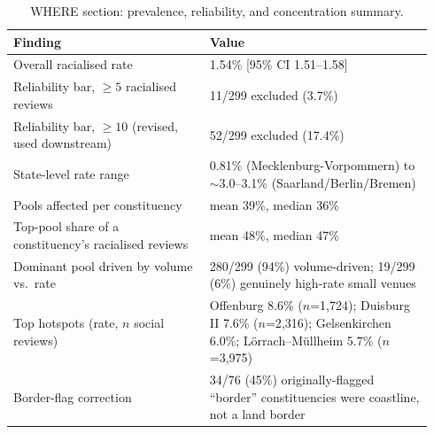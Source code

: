 \begin{table}[htbp]
\centering
\footnotesize
\setlength{\tabcolsep}{4pt}
\caption{WHERE section: prevalence, reliability, and concentration summary.}
\label{tab:where-summary}
\begin{tabular}{@{} p{0.44\linewidth} p{0.5\linewidth} @{}}
\toprule
Finding & Value \\
\midrule
Overall racialised rate & 1.54\% [95\% CI 1.51--1.58] \\
Reliability bar, $\geq 5$ racialised reviews & 11/299 excluded (3.7\%) \\
Reliability bar, $\geq 10$ (revised, used downstream) & 52/299 excluded (17.4\%) \\
State-level rate range & 0.81\% (Mecklenburg-Vorpommern) to $\sim$3.0--3.1\% (Saarland/Berlin/Bremen) \\
Pools affected per constituency & mean 39\%, median 36\% \\
Top-pool share of a constituency's racialised reviews & mean 48\%, median 47\% \\
Dominant pool driven by volume vs.\ rate & 280/299 (94\%) volume-driven; 19/299 (6\%) genuinely high-rate small venues \\
Top hotspots (rate, $n$ social reviews) & Offenburg 8.6\% ($n$=1{,}724); Duisburg II 7.6\% ($n$=2{,}316); Gelsenkirchen 6.0\%; L\"orrach--M\"ullheim 5.7\% ($n$=3{,}975) \\
Border-flag correction & 34/76 (45\%) originally-flagged ``border'' constituencies were coastline, not a land border \\
\bottomrule
\end{tabular}
\end{table}
